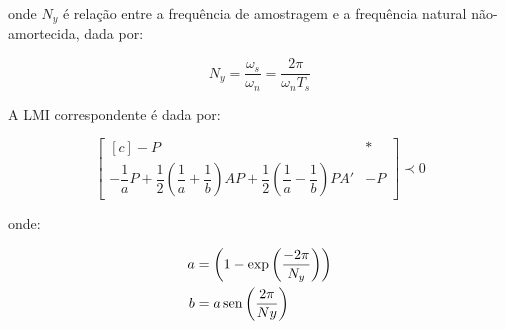 \noindent onde $N_y$ é relação entre a frequência de amostragem e a frequência natural não-amortecida, dada por:

\begin{equation}
  N_y = \dfrac{\omega_s}{\omega_n} = \dfrac{2\pi}{\omega_nT_s}\label{eq:ConstanteNy}
\end{equation}

A LMI correspondente é dada por:

\begin{equation}
  \begin{bmatrix*}[c]
    -P & *\\
    -\dfrac{1}{a}P + \dfrac{1}{2}\left(\dfrac{1}{a}+\dfrac{1}{b}\right)AP + \dfrac{1}{2}\left(\dfrac{1}{a}-\dfrac{1}{b}\right)PA' & -P
  \end{bmatrix*}
  \prec 0\label{eq:LMIElipse}
\end{equation}

\noindent onde:

\begin{subequations}
  \label{eq:PontosElipse}
  \begin{align}
    a &= \left(1-\exp{\left(\frac{-2\pi}{N_y}\right)}\right)\label{eq:PontoAElipse}\\
    b &= a\operatorname{sen}{\left(\frac{2\pi}{Ny}\right)}\label{eq:PontoBElipse}
  \end{align}
\end{subequations}